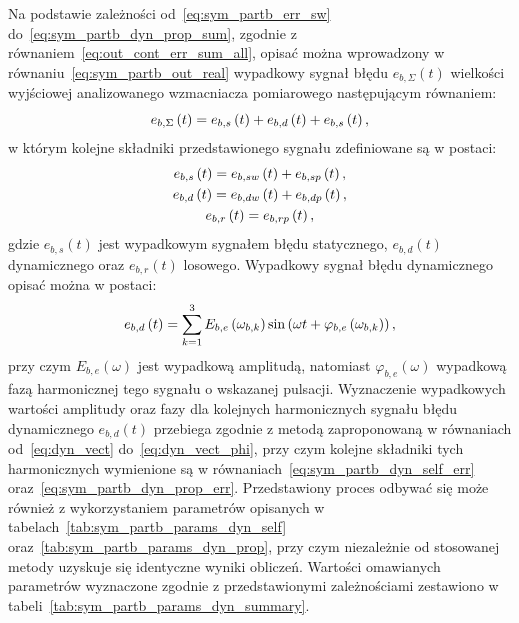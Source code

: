 Na podstawie zależności od~\eqref{eq:sym_partb_err_sw} do~\eqref{eq:sym_partb_dyn_prop_sum}, zgodnie z równaniem~\eqref{eq:out_cont_err_sum_all}, opisać można wprowadzony w równaniu~\eqref{eq:sym_partb_out_real} wypadkowy sygnał błędu $e_{b,\Sigma}(t)$ wielkości wyjściowej analizowanego wzmacniacza pomiarowego następującym równaniem:
\begin{equation}
e_{b,\Sigma} \left(t\right) = e_{b,s} \left(t\right) + e_{b,d} \left(t\right) + e_{b,s} \left(t\right) \label{eq:sym_partb_error_sum},
\end{equation}
w którym kolejne składniki przedstawionego sygnału zdefiniowane są w postaci:
\begin{gather}
e_{b,s} \left(t\right) = e_{b,sw} \left(t\right) + e_{b,sp} \left(t\right) \label{eq:sym_partb_error_stat}, \\
e_{b,d} \left(t\right) = e_{b,dw} \left(t\right) + e_{b,dp} \left(t\right) \label{eq:sym_partb_error_dyn}, \\
e_{b,r} \left(t\right) = e_{b,rp} \left(t\right) \label{eq:sym_partb_error_rand},
\end{gather}
gdzie $e_{b,s}(t)$ jest wypadkowym sygnałem błędu statycznego, $e_{b,d}(t)$ dynamicznego oraz $e_{b,r}(t)$ losowego. Wypadkowy sygnał błędu dynamicznego opisać można w postaci:
\begin{equation}
e_{b,d} \left(t\right) = \sum _{k=1} ^{3} E_{b,e} \left(\omega_{b,k}\right) \sin \left(\omega t + \varphi_{b,e} \left(\omega_{b,k}\right)\right) \label{sym_partb_error_dyn_sum},
\end{equation}
przy czym $E_{b,e}(\omega)$ jest wypadkową amplitudą, natomiast $\varphi_{b,e}(\omega)$ wypadkową fazą harmonicznej tego sygnału o wskazanej pulsacji. Wyznaczenie wypadkowych wartości amplitudy oraz fazy dla kolejnych harmonicznych sygnału błędu dynamicznego $e_{b,d}(t)$ przebiega zgodnie z metodą zaproponowaną w równaniach od~\eqref{eq:dyn_vect} do~\eqref{eq:dyn_vect_phi}, przy czym kolejne składniki tych harmonicznych wymienione są w równaniach~\eqref{eq:sym_partb_dyn_self_err} oraz~\eqref{eq:sym_partb_dyn_prop_err}. Przedstawiony proces odbywać się może również z wykorzystaniem parametrów opisanych w tabelach~\ref{tab:sym_partb_params_dyn_self} oraz~\ref{tab:sym_partb_params_dyn_prop}, przy czym niezależnie od stosowanej metody uzyskuje się identyczne wyniki obliczeń. Wartości omawianych parametrów wyznaczone zgodnie z przedstawionymi zależnościami zestawiono w tabeli~\ref{tab:sym_partb_params_dyn_summary}.

